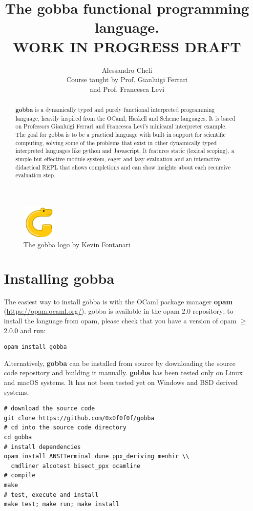 \documentclass[a4paper, 10pt]{article}
\title{The gobba functional programming language.\\WORK IN PROGRESS DRAFT}
\author{Alessandro Cheli\\Course taught by Prof. Gianluigi Ferrari\\and Prof. Francesca Levi}
\theoremstyle{plain}%
\theoremstyle{definition}
\theoremstyle{remark}
\begin{document}
\maketitle

\begin{figure}[htbp!]
	\centering
	\includegraphics[width=0.15\textwidth]{../assets/gobba.png}
	\captionsetup{labelformat=empty}
	\caption{The gobba logo by Kevin Fontanari}
\end{figure}

\begin{abstract}
\textbf{gobba} is a dynamically typed and purely functional interpreted
programming language, heavily inspired from the OCaml,
Haskell and Scheme languages. It is based on Professors Gianluigi Ferrari and Francesca Levi's
minicaml interpreter example. The goal for gobba is to be a practical language
with built in support for scientific computing, solving some of the problems
that exist in other dynamically typed interpreted languages like python and
Javascript. It features static (lexical scoping), a simple but
effective module system, eager and lazy evaluation and an interactive didactical
REPL that shows completions and can show insights about each recursive evaluation step.
\end{abstract}

\section{Installing gobba}

The easiest way to install gobba is with the
OCaml package manager \textbf{opam} (\url{https://opam.ocaml.org/}). gobba is available in the opam 2.0 repository; to install the language from opam, please check that you have a version of opam $\geq$
2.0.0 and run:
\begin{lstlisting}[style=bash]
opam install gobba
\end{lstlisting}
Alternatively, \textbf{gobba} can be installed from source by downloading the
source code repository and building it manually. \textbf{gobba} has been tested
only on Linux and macOS systems. It has not been tested yet on Windows and BSD
derived systems.
\begin{lstlisting}[style=bash]
# download the source code
git clone https://github.com/0x0f0f0f/gobba
# cd into the source code directory
cd gobba
# install dependencies
opam install ANSITerminal dune ppx_deriving menhir \\
  cmdliner alcotest bisect_ppx ocamline
# compile
make
# test, execute and install
make test; make run; make install
\end{lstlisting}
\end{document}
